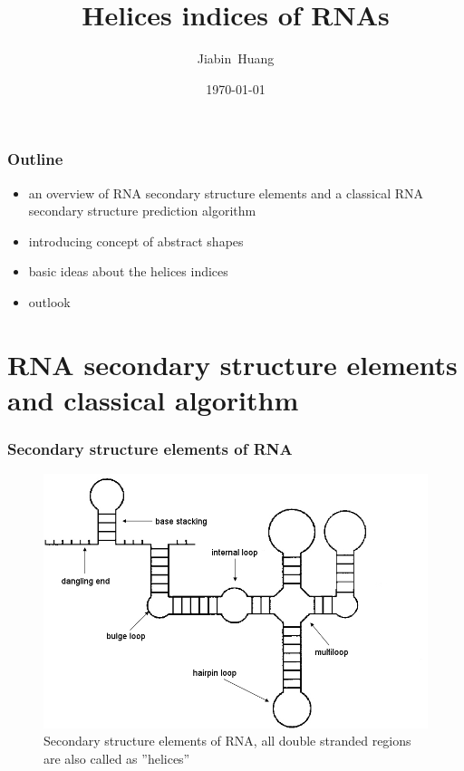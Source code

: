 \documentclass[ignorenonframetext,10pt]{beamer}
\title{Helices indices of RNAs}
\author{\large Jiabin~Huang}
\date{\today}
\institute[ExpBI]{\normalsize
Genetics \& Experimental Bioinformatics\\
University Freiburg\\
Institute of Biology III}
\begin{document}
\frame{\maketitle}

\begin{frame}
\frametitle{Outline}
   \begin{itemize}
   \item an overview of RNA secondary structure elements and a classical RNA secondary structure prediction algorithm
   \item introducing concept of abstract shapes  
   \item basic ideas about the helices indices
   \item outlook            
   \end{itemize}
\end{frame}


\section{RNA secondary structure elements and classical algorithm}
\begin{frame}
\frametitle{Secondary structure elements of RNA}  
\begin{figure}
  \includegraphics[scale=0.35]{images/RNA_components.jpg} 
  \caption{Secondary structure elements of RNA, all double stranded regions are also called as ''helices''}
\end{figure}
\end{frame}
\end{document}
